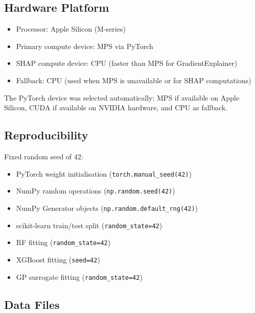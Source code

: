 \subsection{Hardware Platform}
\label{annexure:hardware}

\begin{itemize}
    \item Processor: Apple Silicon (M-series)
    \item Primary compute device: MPS via PyTorch
    \item SHAP compute device: CPU (faster than MPS for GradientExplainer)
    \item Fallback: CPU (used when MPS is unavailable or for SHAP computations)
\end{itemize}

The PyTorch device was selected automatically: MPS if available on Apple Silicon, CUDA if available on NVIDIA hardware, and CPU as fallback.

\subsection{Reproducibility}
\label{annexure:reproducibility}

Fixed random seed of 42:
\begin{itemize}
    \item PyTorch weight initialisation (\texttt{torch.manual\_\allowbreak{}seed(42)})
    \item NumPy random operations (\texttt{np.random.seed(42)})
    \item NumPy Generator objects (\texttt{np.random.default\_\allowbreak{}rng(42)})
    \item scikit-learn train/test split (\texttt{random\_state=42})
    \item RF fitting (\texttt{random\_state=42})
    \item XGBoost fitting (\texttt{seed=42})
    \item GP surrogate fitting (\texttt{random\_state=42})
\end{itemize}

\subsection{Data Files}
\label{annexure:data_files}

